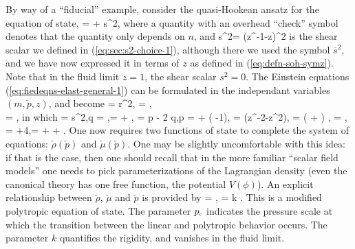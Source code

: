 By way of  a ``fiducial'' example, consider the quasi-Hookean ansatz for the equation of state,
\bea
\epsilon = \check{\epsilon} + \check{\mu}s^2,
\eea
where a quantity with an overhead ``check'' symbol denotes that the quantity only depends on $n$, and
\bea
s^2= \left(z^{-1}-z\right)^2
\eea 
is the shear scalar we defined in (\ref{eq:sec:s2-choice-1}), although there we used the symbol $\overline{s}^2$, and we have now expressed it in terms of $z$ as defined in (\ref{eq:defn-soh-symz}). Note that in the fluid limit $z=1$, the shear scalar $s^2=0$. The Einstein equations (\ref{eq:fiedeqns-elast-general-1}) can be formulated in the independant variables $\left(m,\check{p},z\right)$, and become
\bse
\bea
{} = \half \kappa r^2\rho,
\eea
\bea
{} = ,\nonumber\\
\eea
\bea
{} = ,
\eea
\ese
in which
\bse
\bea
\sigma = \check{\mu}s^2,\qquad q = \check{\mu}\chi,\qquad \rho = \check{\rho} + \sigma,
\eea
\bea
  = p - 2 q,\qquad p =  + \left( \check{\Omega}-1\right)\sigma,
\eea
\bea
\chi = \left(z^{-2}-z^2\right),\qquad \check{\beta} = \left( \check{\rho} + \right) ,\qquad \check{\Omega} = \frac{\check{\beta}}{\check{\mu}},
\eea
\bea
{} = \beta+4\left[ \sigma + \left( \check{\Omega} - \half \right) \right],\qquad \beta = \check{\beta} + \check{\mu} + .
\eea
\ese
One now requires two functions of state to complete the system of equations: $\check{\rho}\left( \check{p}\right)$ and $\check{\mu}\left( \check{p}\right)$. One may be slightly uncomfortable with this idea: if that is the case, then one should recall that in the more familiar ``scalar field models'' one needs to pick parameterizations of the Lagrangian density (even the canonical theory has one free function, the potential $V(\phi)$). 
An explicit relationship between $\check{\rho}$, $\check{\mu}$ and $\check{p}$ is provided by 
\bea
\check{\rho} =  ,\qquad \check{\mu} = k .
\eea
This is a modified polytropic equation of state. The parameter ${p}_{\scriptscriptstyle{\textrm{c}}}$ indicates the pressure scale at which the transition between the linear and polytropic behavior occurs. The parameter $k$ quantifies the rigidity, and vanishes in the fluid limit.

